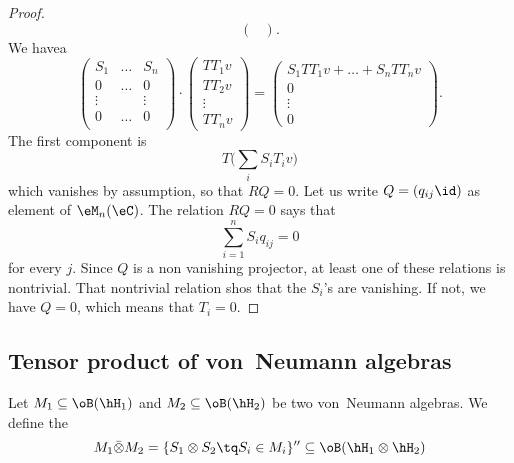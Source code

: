 \begin{proof}
\[\begin{pmatrix}
\end{pmatrix}.
\]
We havea
\[ 
\begin{pmatrix}
S_1&\ldots & S_n\\
0&\ldots & 0 \\
\vdots  &&\vdots\\
0&\ldots & 0 \\
\end{pmatrix}\cdot
  \begin{pmatrix}
TT_1 v\\
TT_2 v\\
\vdots\\
TT_nv
\end{pmatrix}
=
\begin{pmatrix}
S_1TT_1v+\ldots+S_nTT_nv\\
0\\
\vdots\\
0
\end{pmatrix}.
\]
The first component is
\[ 
  T\big( \sum_i S_iT_iv \big)
\]
which vanishes by assumption, so that $RQ=0$. Let us write $Q=(q_{ij}\id)$ as element of $\eM_n(\eC)$. The relation $RQ=0$ says that
\begin{equation}
		\sum_{i=1}^n S_iq_{ij}=0
\end{equation}
for every $j$. Since $Q$ is a non vanishing projector, at least one of these relations is nontrivial. That nontrivial relation shos that the $S_i$'s are vanishing. If not, we have $Q=0$, which means that $T_i=0$.
\end{proof}

					\subsection{Tensor product of von~Neumann algebras}

Let $M_1\subseteq\oB(\hH_1)$ and $M_2\subseteq\oB(\hH_2)$ be two von~Neumann algebras. We define the 
\begin{equation}
	M_1\bar\otimes M_2=\{ S_1\otimes S_2\tq S_i\in M_i \}''\subseteq\oB(\hH_1\otimes\hH_2)
\end{equation}
